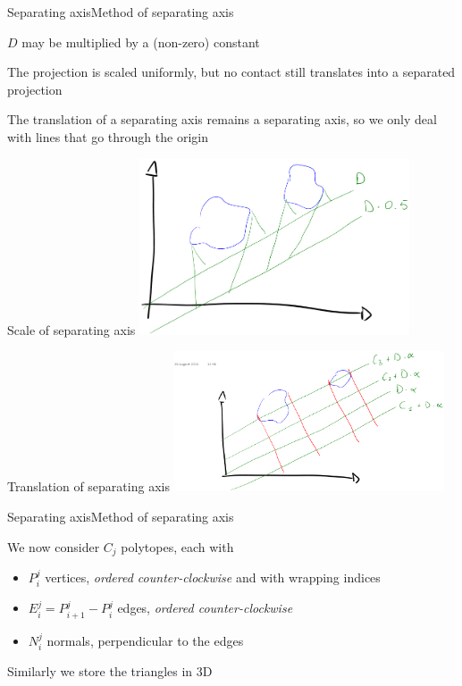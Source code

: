 \documentclass{beamer}
\begin{document}
\begin{slide}{Separating axis}{Method of separating axis}{
\item $D$ may be multiplied by a (non-zero) constant
\item The projection is scaled uniformly, but no contact still translates into a separated projection
\item The translation of a separating axis remains a separating axis, so we only deal with lines that go through the origin
}\end{slide}

\begin{frame}{Scale of separating axis}
\center
\includegraphics[width=8cm]{Pics/ScaleOfSeparatingAxis.png}
\end{frame}

\begin{frame}{Translation of separating axis}
\center
\includegraphics[width=8cm]{Pics/TranslationOfSeparatingAxis.png}
\end{frame}


\begin{slide}{Separating axis}{Method of separating axis}{
\item We now consider $C_j$ polytopes, each with
\begin{itemize}
\item $P_i^j$ vertices, \textit{ordered counter-clockwise} and with wrapping indices
\item $E_i^j = P_{i+1}^j - P_i^j$ edges, \textit{ordered counter-clockwise}
\item $N_i^j$ normals, perpendicular to the edges
\end{itemize}
\item Similarly we store the triangles in 3D
}\end{slide}
\end{document}
